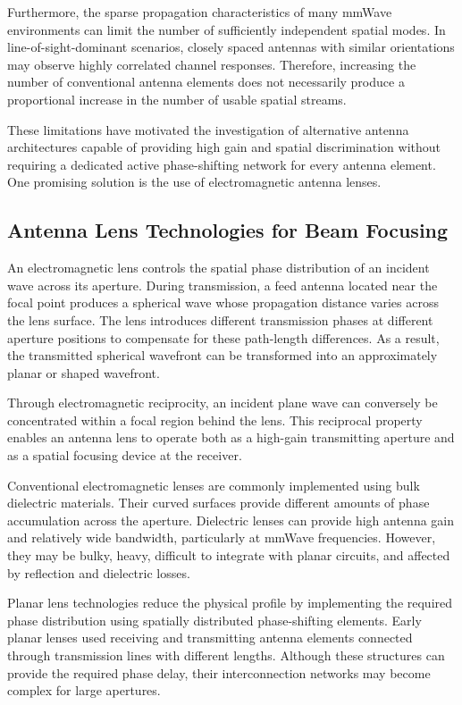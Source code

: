 Furthermore, the sparse propagation characteristics of many mmWave
environments can limit the number of sufficiently independent spatial
modes. In line-of-sight-dominant scenarios, closely spaced antennas
with similar orientations may observe highly correlated channel
responses. Therefore, increasing the number of conventional antenna
elements does not necessarily produce a proportional increase in the
number of usable spatial streams.

These limitations have motivated the investigation of alternative
antenna architectures capable of providing high gain and spatial
discrimination without requiring a dedicated active phase-shifting
network for every antenna element. One promising solution is the use
of electromagnetic antenna lenses.


\subsection{Antenna Lens Technologies for Beam Focusing}
\label{subsec:antenna_lens_technologies}

An electromagnetic lens controls the spatial phase distribution of an
incident wave across its aperture. During transmission, a feed antenna
located near the focal point produces a spherical wave whose
propagation distance varies across the lens surface. The lens
introduces different transmission phases at different aperture
positions to compensate for these path-length differences. As a
result, the transmitted spherical wavefront can be transformed into
an approximately planar or shaped wavefront.

Through electromagnetic reciprocity, an incident plane wave can
conversely be concentrated within a focal region behind the lens.
This reciprocal property enables an antenna lens to operate both as a
high-gain transmitting aperture and as a spatial focusing device at
the receiver.

Conventional electromagnetic lenses are commonly implemented using
bulk dielectric materials. Their curved surfaces provide different
amounts of phase accumulation across the aperture. Dielectric lenses
can provide high antenna gain and relatively wide bandwidth,
particularly at mmWave frequencies. However, they may be bulky,
heavy, difficult to integrate with planar circuits, and affected by
reflection and dielectric losses.

Planar lens technologies reduce the physical profile by implementing
the required phase distribution using spatially distributed
phase-shifting elements. Early planar lenses used receiving and
transmitting antenna elements connected through transmission lines
with different lengths. Although these structures can provide the
required phase delay, their interconnection networks may become
complex for large apertures.

